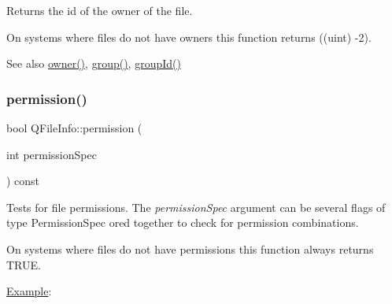 Returns the id of the owner of the file.

On systems where files do not have owners this function returns ((uint) -\/2).

\begin{DoxySeeAlso}{See also}
\mbox{\hyperlink{class_q_file_info_a96831b45809e905dc14e5c065bfa8421}{owner()}}, \mbox{\hyperlink{class_q_file_info_afb46f8fb3080ab0b32b4236436624ea3}{group()}}, \mbox{\hyperlink{class_q_file_info_a40e9808fbf54b07717d2f3a4307da74f}{group\+Id()}} 
\end{DoxySeeAlso}
\mbox{\label{class_q_file_info_a51ec346b961f115fd7e45664d27862db}} 
\subsubsection{\texorpdfstring{permission()}{permission()}}
{\footnotesize\ttfamily bool Q\+File\+Info\+::permission (\begin{DoxyParamCaption}\item[{int}]{permission\+Spec }\end{DoxyParamCaption}) const}

Tests for file permissions. The {\itshape permission\+Spec} argument can be several flags of type Permission\+Spec or\textquotesingle{}ed together to check for permission combinations.

On systems where files do not have permissions this function always returns T\+R\+UE.

\mbox{\hyperlink{struct_example}{Example}}\+: 
\begin{DoxyCode}{0}
\end{DoxyCode}


